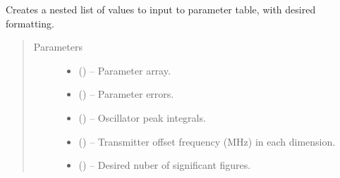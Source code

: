 \documentclass[letterpaper,10pt,english]{sphinxmanual}
\begin{document}
\begin{fulllineitems}
\label{\detokenize{references/write:nmrespy.write._construct_paramtable}}
\sphinxAtStartPar
Creates a nested list of values to input to parameter table, with
desired formatting.
\begin{quote}\begin{description}
\item[{Parameters}] \leavevmode\begin{itemize}
\item {} 
\sphinxAtStartPar
{} () – Parameter array.

\item {} 
\sphinxAtStartPar
{} () – Parameter errors.

\item {} 
\sphinxAtStartPar
{} () – Oscillator peak integrals.

\item {} 
\sphinxAtStartPar
{} (\sphinxstyleliteralemphasis{\sphinxupquote{{[}}}\sphinxstyleliteralemphasis{\sphinxupquote{{]}}}\sphinxstyleliteralemphasis{\sphinxupquote{{[}}}\sphinxstyleliteralemphasis{\sphinxupquote{, }}\sphinxstyleliteralemphasis{\sphinxupquote{{]} or }}) – Transmitter offset frequency (MHz) in each dimension.

\item {} 
\sphinxAtStartPar
{} () – Desired nuber of significant figures.


\end{itemize}
\end{description}
\end{quote}
\end{fulllineitems}
\end{document}
